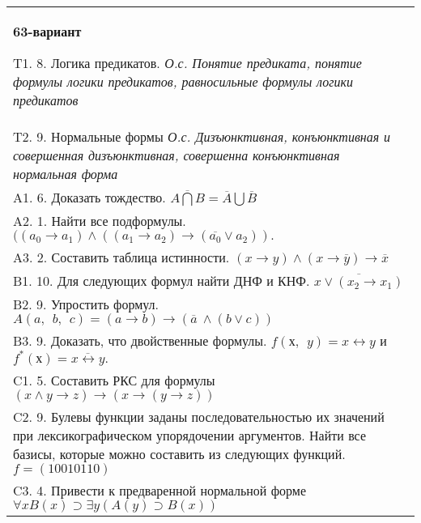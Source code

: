 \documentclass{article}
\begin{document}
\begin{tabular}{m{17cm}}
\textbf{63-вариант}
\newline

T1. 8. Логика предикатов. \emph{О.с. Понятие предиката, понятие формулы логики предикатов, равносильные формулы логики предикатов} \\
T2. 9. Нормальные формы \emph{О.с. Дизъюнктивная, конъюнктивная и совершенная дизъюнктивная, совершенна конъюнктивная нормальная форма} \\
A1. 6. Доказать тождество. \(\overline{A\bigcap B} = \overline{A}\bigcup\overline{B}\) \\
A2. 1. Найти все подформулы. \(((a_{0} \rightarrow a_{1}) \land ((a_{1} \rightarrow a_{2}) \rightarrow (\overline{a_{0}} \vee a_{2})).\) \\
A3. 2. Составить таблица истинности. \((x \rightarrow y) \land (x \rightarrow \overline{y}) \rightarrow \overline{x}\) \\
B1. 10. Для следующих формул найти ДНФ и КНФ. \(\overline{x \vee (x_{2} \rightarrow x_{1})}\) \\
B2. 9. Упростить формул. \(A(a,\ \ b,\ \ c) = (a \rightarrow b) \rightarrow (\overline{a}\  \land (b \vee c))\) \\
B3. 9. Доказать, что двойственные формулы. \(f(х,\ \ y) = x \leftrightarrow y\) и \(f^{*}(х) = \overline{x \leftrightarrow y}.\) \\
C1. 5. Составить РКС для формулы \((x \land y \rightarrow z) \rightarrow (x \rightarrow (y \rightarrow z))\) \\
C2. 9. Булевы функции заданы последовательностью их значений при лексикографическом упорядочении аргументов. Найти все базисы, которые можно составить из следующих функций. \(f = (10010110)\) \\
C3. 4. Привести к предваренной нормальной форме \(\forall xB(x) \supset \exists y(A(y) \supset B(x))\) \\

\end{tabular}
\vspace{1cm}
\end{document}

